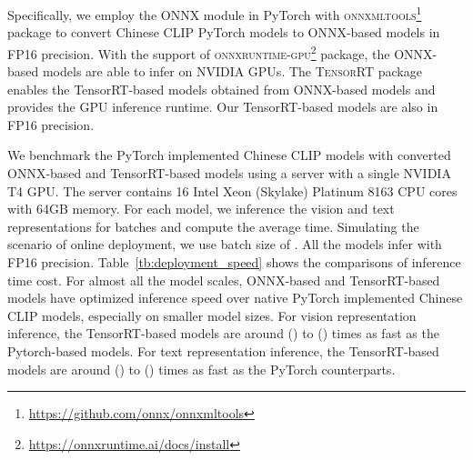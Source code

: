 \documentclass[11pt]{article}
\begin{document}
Specifically, we employ the ONNX module in PyTorch with \textsc{onnxmltools}\footnote{\url{https://github.com/onnx/onnxmltools}} package to convert Chinese CLIP PyTorch models to ONNX-based models in FP16 precision. With the support of \textsc{onnxruntime-gpu}\footnote{\url{https://onnxruntime.ai/docs/install}} package, the ONNX-based models are able to infer on NVIDIA GPUs. The \textsc{TensorRT} package enables the TensorRT-based models obtained from ONNX-based models and provides the GPU inference runtime. Our TensorRT-based models are also in FP16 precision.

We benchmark the PyTorch implemented Chinese CLIP models with converted ONNX-based and TensorRT-based models using a server with a single NVIDIA T4 GPU. The server contains \num{16} Intel Xeon (Skylake) Platinum 8163 CPU cores with \num{64}GB memory. For each model, we inference the vision and text representations for  batches and compute the average time. Simulating the scenario of online deployment, we use batch size of . All the models infer with FP16 precision. Table~\ref{tb:deployment_speed} shows the comparisons of inference time cost. For almost all the model scales, ONNX-based and TensorRT-based models have optimized inference speed over native PyTorch implemented Chinese CLIP models, especially on smaller model sizes. For vision representation inference, the TensorRT-based models are around  () to  () times as fast as the Pytorch-based models. For text representation inference, the TensorRT-based models are around  () to  () times as fast as the PyTorch counterparts.
\end{document}
